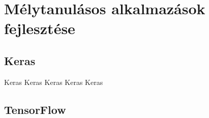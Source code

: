 \chapter{Mélytanulásos alkalmazások fejlesztése}
\section{Keras}
Keras Keras Keras Keras Keras 
\section{TensorFlow}

